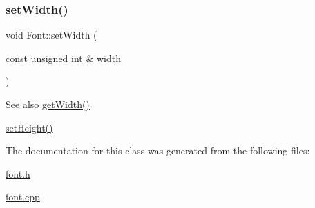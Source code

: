 \subsubsection{\texorpdfstring{set\+Width()}{setWidth()}}
{\footnotesize\ttfamily void Font\+::set\+Width (\begin{DoxyParamCaption}\item[{const unsigned int \&}]{width }\end{DoxyParamCaption})}

\begin{DoxySeeAlso}{See also}
\mbox{\hyperlink{class_font_a9466673d1576043dc7fa7d0bfcc505e0}{get\+Width()}} 

\mbox{\hyperlink{class_font_adc672745b542873f41cd3e13c3b05da3}{set\+Height()}} 
\end{DoxySeeAlso}


The documentation for this class was generated from the following files\+:\begin{DoxyCompactItemize}
\item 
\mbox{\hyperlink{font_8h}{font.\+h}}\item 
\mbox{\hyperlink{font_8cpp}{font.\+cpp}}\end{DoxyCompactItemize}
